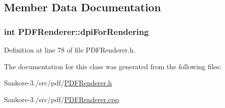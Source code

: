 \subsection{Member Data Documentation}
\hypertarget{class_p_d_f_renderer_a2cbfdcd0a7c6bbea158b0e7e324fdbe1}{
\subsubsection[{dpi\-For\-Rendering}]{\setlength{\rightskip}{0pt plus 5cm}int P\-D\-F\-Renderer\-::dpi\-For\-Rendering\hspace{0.3cm}{\ttfamily [protected]}}}\label{d7/dc9/class_p_d_f_renderer_a2cbfdcd0a7c6bbea158b0e7e324fdbe1}


Definition at line 78 of file P\-D\-F\-Renderer.\-h.



The documentation for this class was generated from the following files\-:\begin{DoxyCompactItemize}
\item 
Sankore-\/3./src/pdf/\hyperlink{_p_d_f_renderer_8h}{P\-D\-F\-Renderer.\-h}\item 
Sankore-\/3./src/pdf/\hyperlink{_p_d_f_renderer_8cpp}{P\-D\-F\-Renderer.\-cpp}\end{DoxyCompactItemize}
